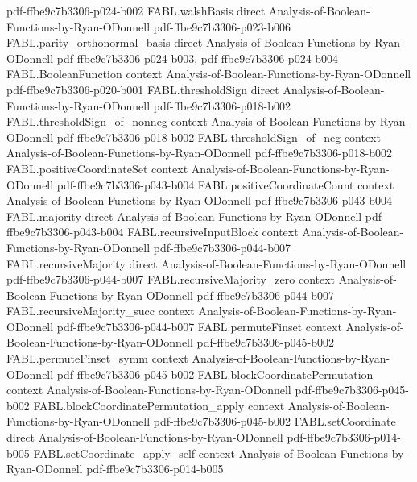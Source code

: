 \begin{theorem}
  {pdf-ffbe9c7b3306-p024-b002}
\proofstep
  {FABL.walshBasis}
  {direct}
  {Analysis-of-Boolean-Functions-by-Ryan-ODonnell}
  {pdf-ffbe9c7b3306-p023-b006}
\proofstep
  {FABL.parity_orthonormal_basis}
  {direct}
  {Analysis-of-Boolean-Functions-by-Ryan-ODonnell}
  {pdf-ffbe9c7b3306-p024-b003,
    pdf-ffbe9c7b3306-p024-b004}
\proofstep
  {FABL.BooleanFunction}
  {context}
  {Analysis-of-Boolean-Functions-by-Ryan-ODonnell}
  {pdf-ffbe9c7b3306-p020-b001}
\proofstep
  {FABL.thresholdSign}
  {direct}
  {Analysis-of-Boolean-Functions-by-Ryan-ODonnell}
  {pdf-ffbe9c7b3306-p018-b002}
\proofstep
  {FABL.thresholdSign_of_nonneg}
  {context}
  {Analysis-of-Boolean-Functions-by-Ryan-ODonnell}
  {pdf-ffbe9c7b3306-p018-b002}
\proofstep
  {FABL.thresholdSign_of_neg}
  {context}
  {Analysis-of-Boolean-Functions-by-Ryan-ODonnell}
  {pdf-ffbe9c7b3306-p018-b002}
\proofstep
  {FABL.positiveCoordinateSet}
  {context}
  {Analysis-of-Boolean-Functions-by-Ryan-ODonnell}
  {pdf-ffbe9c7b3306-p043-b004}
\proofstep
  {FABL.positiveCoordinateCount}
  {context}
  {Analysis-of-Boolean-Functions-by-Ryan-ODonnell}
  {pdf-ffbe9c7b3306-p043-b004}
\proofstep
  {FABL.majority}
  {direct}
  {Analysis-of-Boolean-Functions-by-Ryan-ODonnell}
  {pdf-ffbe9c7b3306-p043-b004}
\proofstep
  {FABL.recursiveInputBlock}
  {context}
  {Analysis-of-Boolean-Functions-by-Ryan-ODonnell}
  {pdf-ffbe9c7b3306-p044-b007}
\proofstep
  {FABL.recursiveMajority}
  {direct}
  {Analysis-of-Boolean-Functions-by-Ryan-ODonnell}
  {pdf-ffbe9c7b3306-p044-b007}
\proofstep
  {FABL.recursiveMajority_zero}
  {context}
  {Analysis-of-Boolean-Functions-by-Ryan-ODonnell}
  {pdf-ffbe9c7b3306-p044-b007}
\proofstep
  {FABL.recursiveMajority_succ}
  {context}
  {Analysis-of-Boolean-Functions-by-Ryan-ODonnell}
  {pdf-ffbe9c7b3306-p044-b007}
\proofstep
  {FABL.permuteFinset}
  {context}
  {Analysis-of-Boolean-Functions-by-Ryan-ODonnell}
  {pdf-ffbe9c7b3306-p045-b002}
\proofstep
  {FABL.permuteFinset_symm}
  {context}
  {Analysis-of-Boolean-Functions-by-Ryan-ODonnell}
  {pdf-ffbe9c7b3306-p045-b002}
\proofstep
  {FABL.blockCoordinatePermutation}
  {context}
  {Analysis-of-Boolean-Functions-by-Ryan-ODonnell}
  {pdf-ffbe9c7b3306-p045-b002}
\proofstep
  {FABL.blockCoordinatePermutation_apply}
  {context}
  {Analysis-of-Boolean-Functions-by-Ryan-ODonnell}
  {pdf-ffbe9c7b3306-p045-b002}
\proofstep
  {FABL.setCoordinate}
  {direct}
  {Analysis-of-Boolean-Functions-by-Ryan-ODonnell}
  {pdf-ffbe9c7b3306-p014-b005}
\proofstep
  {FABL.setCoordinate_apply_self}
  {context}
  {Analysis-of-Boolean-Functions-by-Ryan-ODonnell}
  {pdf-ffbe9c7b3306-p014-b005}

\end{theorem}
